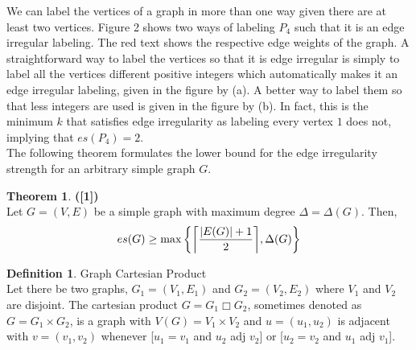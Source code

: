 \documentclass[12pt, a4paper]{report}
\newlength\tindent
\renewcommand{\indent}{\hspace*{\tindent}}
\DeclarePairedDelimiter{\ceil}{\lceil}{\rceil}
\theoremstyle{definition}
\newtheorem{definition}{Definition}
\theoremstyle{definition}
\newtheorem{theorem}{Theorem}
\theoremstyle{remark}
\theoremstyle{definition}
\theoremstyle{definition}
\begin{document}
\indent We can label the vertices of a graph in more than one way given there are at least two vertices. Figure 2 shows two ways of labeling $P_4$ such that it is an edge irregular labeling. The red text shows the respective edge weights of the graph. A straightforward way to label the vertices so that it is edge irregular is simply to label all the vertices different positive integers which automatically makes it an edge irregular labeling, given in the figure by (a). A better way to label them so that less integers are used is given in the figure by (b). In fact, this is the minimum $k$ that satisfies edge irregularity as labeling every vertex $1$ does not, implying that $es(P_4 )=2$.\\
\indent The following theorem formulates the lower bound for the edge irregularity strength for an arbitrary simple graph $G$.

\begin{theorem} \textbf{([1])}
\\\indent Let $G=(V,E)$ be a simple graph with maximum degree $\Delta=\Delta(G)$. Then,
\begin{equation*}
	es(G) \geq \max \bigg\{ \ceil[\bigg ]{\frac{|E(G)| + 1}{2}}, \Delta(G) \bigg\}
\end{equation*}
\end{theorem}

\newpage


\begin{definition}{Graph Cartesian Product}
\\\indent Let there be two graphs, $G_1 = (V_1, E_1)$ and $G_2 = (V_2, E_2)$ where $V_1$ and $V_2$ are disjoint. The cartesian product $G=G_1\Box G_2$, sometimes denoted as $G=G_1\times G_2$, is a graph with $V(G)=V_1\times V_2$ and $u=(u_1,u_2)$ is adjacent with $v=(v_1,v_2)$ whenever [$u_1 = v_1$ and $u_2$ adj $v_2$] or [$u_2 = v_2$ and $u_1$ adj $v_1$].
\end{definition}
\end{document}
